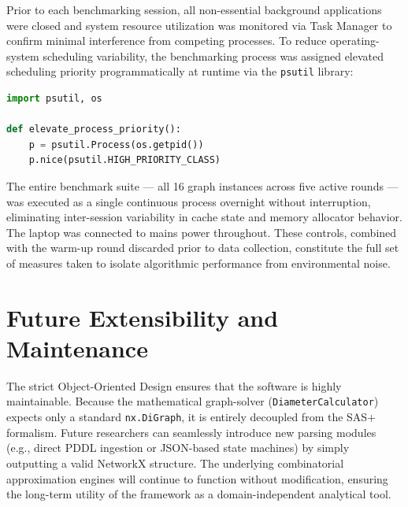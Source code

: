 Prior to each benchmarking session, all non-essential background applications were closed and system resource utilization was monitored via Task Manager to confirm minimal interference from competing processes. To reduce operating-system scheduling variability, the benchmarking process was assigned elevated scheduling priority programmatically at runtime via the \texttt{psutil} library:

\begin{lstlisting}[language=Python, caption={Process priority elevation for scheduling stability.}, label={lst:priority}]
import psutil, os

def elevate_process_priority():
    p = psutil.Process(os.getpid())
    p.nice(psutil.HIGH_PRIORITY_CLASS)
\end{lstlisting}

The entire benchmark suite --- all 16 graph instances across five active rounds --- was executed as a single continuous process overnight without interruption, eliminating inter-session variability in cache state and memory allocator behavior. The laptop was connected to mains power throughout. These controls, combined with the warm-up round discarded prior to data collection, constitute the full set of measures taken to isolate algorithmic performance from environmental noise.

\section{Future Extensibility and Maintenance}
The strict Object-Oriented Design ensures that the software is highly maintainable. Because the mathematical graph-solver (\texttt{DiameterCalculator}) expects only a standard \texttt{nx.DiGraph}, it is entirely decoupled from the SAS+ formalism. Future researchers can seamlessly introduce new parsing modules (e.g., direct PDDL ingestion or JSON-based state machines) by simply outputting a valid NetworkX structure. The underlying combinatorial approximation engines will continue to function without modification, ensuring the long-term utility of the framework as a domain-independent analytical tool.
